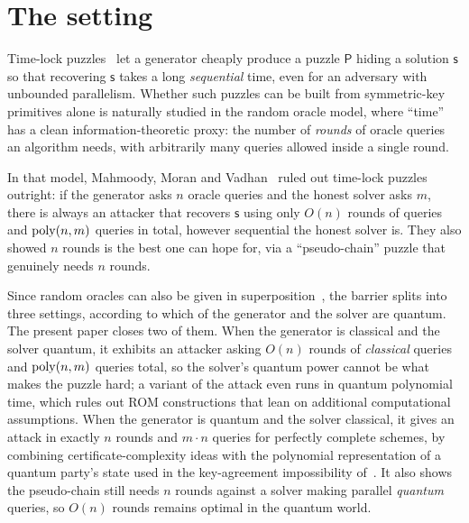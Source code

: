 \documentclass{aicr-conjecture}
\newcommand{\puz}{\mathsf{P}}
\newcommand{\solu}{\mathsf{s}}
\begin{document}
\section{The setting}\label{sec:setting}

Time-lock puzzles~\cite{RSW96} let a generator cheaply produce a puzzle
$\puz$ hiding a solution $\solu$ so that recovering $\solu$ takes a long
\emph{sequential} time, even for an adversary with unbounded parallelism.
Whether such puzzles can be built from symmetric-key primitives alone is
naturally studied in the random oracle model, where ``time'' has a clean
information-theoretic proxy: the number of \emph{rounds} of oracle queries
an algorithm needs, with arbitrarily many queries allowed inside a single
round.

In that model, Mahmoody, Moran and Vadhan~\cite{MMV11} ruled out time-lock
puzzles outright: if the generator asks $n$ oracle queries and the honest
solver asks $m$, there is always an attacker that recovers $\solu$ using
only $O(n)$ rounds of queries and $\mathrm{poly}(n,m)$ queries in total, however
sequential the honest solver is. They also showed $n$ rounds is the best one
can hope for, via a ``pseudo-chain'' puzzle that genuinely needs $n$ rounds.

Since random oracles can also be given in superposition~\cite{BDF11}, the
barrier splits into three settings, according to which of the generator and
the solver are quantum. The present paper closes two of them. When the
generator is classical and the solver quantum, it exhibits an attacker
asking $O(n)$ rounds of \emph{classical} queries and $\mathrm{poly}(n,m)$ queries
total, so the solver's quantum power cannot be what makes the puzzle hard; a
variant of the attack even runs in quantum polynomial time, which rules out
ROM constructions that lean on additional computational assumptions. When
the generator is quantum and the solver classical, it gives an attack in
exactly $n$ rounds and $m \cdot n$ queries for perfectly complete schemes,
by combining certificate-complexity ideas with the polynomial
representation of a quantum party's state used in the key-agreement
impossibility of~\cite{ACC22}. It also shows the pseudo-chain still needs
$n$ rounds against a solver making parallel \emph{quantum} queries, so
$O(n)$ rounds remains optimal in the quantum world.
\end{document}
